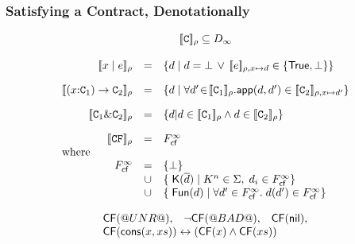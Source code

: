 \documentclass[serif,professionalfont]{beamer}
\begin{document}
\begin{frame}
  \frametitle{Satisfying a Contract, Denotationally}

    \[\begin{array}{rcl}
    \multicolumn{3}{c}{
      {\dbrace{\Ct}_{\rho} \subseteq D_{\infty}}
    }
    \\ \\
    \dbrace{x \mid e}_\rho
      & =  & \{ d \mid \unroll{d} = \bot \, \lor \, \unroll{\dbrace{e}_{\rho,x \mapsto d}}
                    \in \{ \ret{\injKZ{True} , \bot} \} \}
    \\[1em]
    \dbrace{(x{:}\Ct_1) \to \Ct_2}_{\rho}
     & = & \{ d \mid
               \forall d' \!\in\! \dbrace{\Ct_1}_\rho.
               \dapp(d,d') \in \dbrace{\Ct_2}_{\rho,x \mapsto d'}
               \}
    \\[1em]
    \dbrace{\Ct_1 \& \Ct_2}_\rho
     & = & \{ d | d \in \dbrace{\Ct_1}_\rho \land d \in \dbrace{\Ct_2}_\rho \}
    \\[1em]
    \dbrace{\CF}_\rho & = &  \Fcf^{\infty}  \\
    \multicolumn{3}{l}{\text{where}} \\
       F_{\lcfZ}^{\infty} & = & \{ \bot \} \\
                       & \cup & \{\;\injK{K}{\ol{d}} \mid K^n \in \Sigma,\; d_i \in F_{\lcfZ}^{\infty} \} \\
                       & \cup & \{\;\injFun{d} \mid \forall d' \in F_{\lcfZ}^{\infty}.\; d(d') \in F_{\lcfZ}^{\infty} \}
    \end{array}\]

    \pause

    \[\begin{array}{lll}
    \cf(\unr), & \neg \cf(\bad), & \cf(\nil),   \\
    \multicolumn{3}{l}{\cf(\cons{x}{xs}) \leftrightarrow (\cf(x) \land \cf(xs))}
    \end{array}\]

\end{frame}
\end{document}
